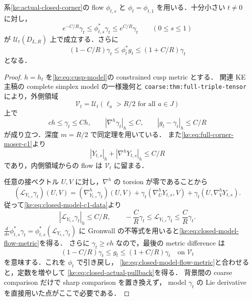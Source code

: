 \begin{lemma}
\label{ke:closed-corner-moser-metric}
系\ref{ke:actual-closed-corner}の flow $\phi_{t,s}$ と
$\phi_t=\phi_{t,1}$ を用いる．十分小さい $t\ne0$ に対し，
\begin{equation}\label{ke:eq:closed-model-flow-metric}
 e^{-C/R}\gamma_t\le\phi_{t,s}^*\gamma_t
                 \le e^{C/R}\gamma_t
 \qquad(0\le s\le1)
\end{equation}
が $\mathcal U_t(D_{L,R})$ 上で成立する．さらに
\begin{equation}\label{ke:eq:closed-actual-pullback}
 (1-C/R)\gamma_t\le\phi_t^*g_t\le(1+C/R)\gamma_t
\end{equation}
となる．
\end{lemma}
\begin{proof}
$h=h_t$ を\eqref{ke:eq:cusp-model}の constrained cusp metric とする．
関連 KE 主稿の complete simplex model の一様幾何と
\texttt{coarse:thm:full-triple-tensor} により，外側領域
\[
 \mathcal V_t=\mathcal U_t(\ell_a>R/2\text{ for all }a\in J)
\]
上で
\begin{equation}\label{ke:eq:closed-model-c1-data}
 c h\le\gamma_t\le C h,
 \qquad |\nabla^h\gamma_t|_h\le C,
 \qquad |g_t-\gamma_t|_h\le C/R
\end{equation}
が成り立つ．深度 $m=R/2$ で同定理を用いている．
また\eqref{ke:eq:full-corner-moser-c1}より
\[
 |Y_{t,s}|_h+|\nabla^hY_{t,s}|_h\le C/R
\]
であり，内側領域からの flow は $\mathcal V_t$ に留まる．

任意の接ベクトル $U,V$ に対し，$\nabla^h$ の torsion が零であることから
\[
 (\mathcal L_{Y_{t,s}}\gamma_t)(U,V)
 =(\nabla^h_{Y_{t,s}}\gamma_t)(U,V)
  +\gamma_t(\nabla^h_UY_{t,s},V)
  +\gamma_t(U,\nabla^h_VY_{t,s}).
\]
従って\eqref{ke:eq:closed-model-c1-data}より
\[
 |\mathcal L_{Y_{t,s}}\gamma_t|_h\le C/R,
 \qquad
 -\frac CR\gamma_t\le\mathcal L_{Y_{t,s}}\gamma_t
                         \le\frac CR\gamma_t.
\]
$\frac{d}{ds}\phi_{t,s}^*\gamma_t
=\phi_{t,s}^*(\mathcal L_{Y_{t,s}}\gamma_t)$ に
Gronwall の不等式を用いると\eqref{ke:eq:closed-model-flow-metric}を得る．
さらに $\gamma_t\ge ch$ なので，最後の metric difference は
\[
 (1-C/R)\gamma_t\le g_t\le(1+C/R)\gamma_t
 \quad\text{on }\mathcal V_t
\]
を意味する．これを $\phi_t$ で引き戻し，
\eqref{ke:eq:closed-model-flow-metric}と合わせると，定数を増やして
\eqref{ke:eq:closed-actual-pullback}を得る．
背景間の coarse comparison だけで sharp comparison を置き換えず，
model $\gamma_t$ の Lie derivative を直接用いた点がここで必要である．
\end{proof}

